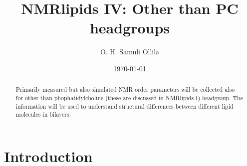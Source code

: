\documentclass[aps,prl,superscriptaddress,twocolumn]{revtex4}
\begin{document}

\title{NMRlipids IV: Other than PC headgroups} %



\author{O. H. Samuli Ollila}



\date{\today}

\begin{abstract}
  Primarily measured but also simulated NMR order parameters will be collected also for other than phophatidylcholine
  (these are discussed in NMRlipids I) headgroup. The information will be used to understand structural differences between 
  different lipid molecules in bilayers.
\end{abstract}


\maketitle %



\section{Introduction}
\end{document}
